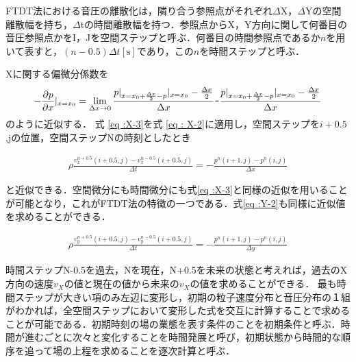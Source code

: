 \documentclass[a4j,12pt]{jsarticle}
\begin{document}
FTDT法における音圧の離散化は，隣り合う参照点がそれぞれ$\Delta$X，$\Delta$Yの空間離散幅を持ち，$\Delta$tの時間離散幅を持つ．参照点からX，Y方向に関して何番目の音圧参照点かをI，Jを空間ステップと呼ぶ．何番目の時間参照点であるか$n$を用いて表すと，$(n-0.5)\Delta t\mathrm{[s]}$であり，この$n$を時間ステップと呼ぶ．

Xに関する偏微分係数を
\begin {eqnarray}
\label{eq :X-3}
- \frac { \partial p }{ \partial x }|_{ x=x_0} = \lim_{\Delta x \to 0} \frac{p|_{x=x_0+ \frac {\Delta x}{2} -p}| _{x=x_0} - \frac{ \Delta x}{2} }{ \Delta x} \verb|~| \frac{p|_{x=x_0+ \frac {\Delta x}{2} -p}| _{x=x_0} - \frac{ \Delta x}{2} }{ \Delta x}
\end{eqnarray}
のように近似する．
式 \ref{eq :X-3}を式 \ref{eq : X-2}に適用し，空間ステップを$i+0.5$,jの位置，空間ステップNの時刻としたとき

\begin {eqnarray}
\label{eq:X-4}
\rho \frac{ v_x^{n+0.5}( i+0.5, j ) -v_x^{ n-0.5 }( i+0.5,j ) }{ \Delta t } = - \frac{ p^n( i+1 ,j ) -p^n( i,j ) }{ \Delta x }
\end{eqnarray}

と近似できる．空間微分にも時間微分にも式\ref{eq :X-3}と同様の近似を用いることが可能となり，これがFTDT法の特徴の一つである．式\ref{eq :Y-2}も同様に近似値を求めることができる．

\begin {eqnarray}
\label{eq:Y-4}
\rho \frac{ v_y^{n+0.5}( i+0.5, j ) -v_y^{ n-0.5 }( i+0.5,j ) }{ \Delta t } = - \frac{ p^n( i+1 ,j ) -p^n( i,j ) }{ \Delta y }
\end{eqnarray}


時間ステップN-0.5を過去，Nを現在，N+0.5を未来の状態と考えれば，過去のX方向の速度$v_X$の値と現在の値から未来の$v_X$の値を求めることができる．
最も時間ステップが大きい項のみ左辺に変形し，初期の粒子速度分布と音圧分布の１組がわかれば，全空間ステップにおいて変形した式を交互に計算することで求めることが可能である．初期時刻の場の業態を表す条件のことを初期条件と呼ぶ．時間が進むごとに次々と変化することを時間発展と呼び，初期状態から時間的な順序を追って場の上程を求めることを逐次計算と呼ぶ．

\newpage
\end{document}

